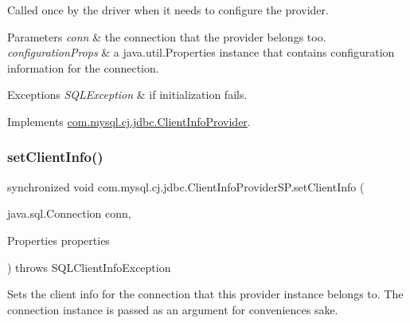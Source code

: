 Called once by the driver when it needs to configure the provider.


\begin{DoxyParams}{Parameters}
{\em conn} & the connection that the provider belongs too. \\
\hline
{\em configuration\+Props} & a java.\+util.\+Properties instance that contains configuration information for the connection. \\
\hline
\end{DoxyParams}

\begin{DoxyExceptions}{Exceptions}
{\em S\+Q\+L\+Exception} & if initialization fails. \\
\hline
\end{DoxyExceptions}


Implements \mbox{\hyperlink{interfacecom_1_1mysql_1_1cj_1_1jdbc_1_1_client_info_provider_aacf1104fd90e2c5b1ca940d63e884cf6}{com.\+mysql.\+cj.\+jdbc.\+Client\+Info\+Provider}}.

\mbox{\label{classcom_1_1mysql_1_1cj_1_1jdbc_1_1_client_info_provider_s_p_a19b01b8ef9dd49bf29b66c079822d2eb}} 
\subsubsection{\texorpdfstring{set\+Client\+Info()}{setClientInfo()}\hspace{0.1cm}{\footnotesize\ttfamily [1/2]}}
{\footnotesize\ttfamily synchronized void com.\+mysql.\+cj.\+jdbc.\+Client\+Info\+Provider\+S\+P.\+set\+Client\+Info (\begin{DoxyParamCaption}\item[{java.\+sql.\+Connection}]{conn,  }\item[{Properties}]{properties }\end{DoxyParamCaption}) throws S\+Q\+L\+Client\+Info\+Exception}

Sets the client info for the connection that this provider instance belongs to. The connection instance is passed as an argument for convenience\textquotesingle{}s sake.

